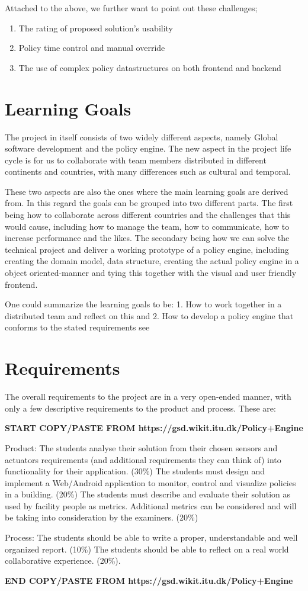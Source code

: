 Attached to the above, we further want to point out these challenges;
\begin{enumerate}
	\item The rating of proposed solution's usability
	\item Policy time control and manual override
	\item The use of complex policy datastructures on both frontend and backend
\end{enumerate}

\section{Learning Goals} \label{sec:learninggoals}
The project in itself consists of two widely different aspects, namely Global software development and the policy engine. The new aspect in the project life cycle is for us to collaborate with team members distributed in different continents and countries, with many differences such as cultural and temporal.

These two aspects are also the ones where the main learning goals are derived from. In this regard the goals can be grouped into two different parts. The first being how to collaborate across different countries and the challenges that this would cause, including how to manage the team, how to communicate, how to increase performance and the likes. The secondary being how we can solve the technical project and deliver a working prototype of a policy engine, including creating the domain model, data structure, creating the actual policy engine in a object oriented-manner and tying this together with the visual and user friendly frontend.

One could summarize the learning goals to be: 1. How to work together in a distributed team and reflect on this and 2. How to develop a policy engine that conforms to the stated requirements see 

\section{Requirements} \label{sec:requirements}
The overall requirements to the project are in a very open-ended manner, with only a few descriptive requirements to the product and process. These are:

\textbf{START COPY/PASTE FROM https://gsd.wikit.itu.dk/Policy+Engine}

Product:
The students analyse their solution from their chosen sensors and actuators requirements (and additional requirements they can think of) into functionality for their application. (30\%)
The students must design and implement a Web/Android application to monitor, control and visualize policies in a building. (20\%)
The students must describe and evaluate their solution as used by facility people as metrics. Additional metrics can be considered and will be taking into consideration by the examiners. (20\%)

Process:
The students should be able to write a proper, understandable and well organized report. (10\%)
The students should be able to reflect on a real world collaborative experience. (20\%).

\textbf{END COPY/PASTE FROM https://gsd.wikit.itu.dk/Policy+Engine}

